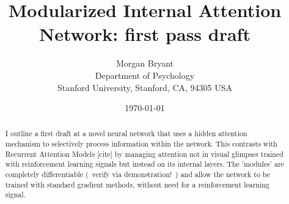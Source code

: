 \documentclass[12pt]{article}
\title{Modularized Internal Attention Network: first pass draft}
\author{
        Morgan Bryant\\
        Department of Psychology\\
		Stanford University, Stanford, CA, 94305 USA
}
\date{\today}
\begin{document}
\maketitle

\begin{abstract}
I outline a first draft at a novel neural network that uses a hidden attention mechanism to selectively process information within the network.  This contrasts with Recurrent Attention Models [cite] by managing attention not in visual glimpses trained with reinforcement learning signals but instead on its internal layers.  The 'modules' are completely differentiable (~verify via demonstration!~) and allow the network to be trained with standard gradient methods, without need for a reinforcement learning signal.
\end{abstract}
\end{document}
